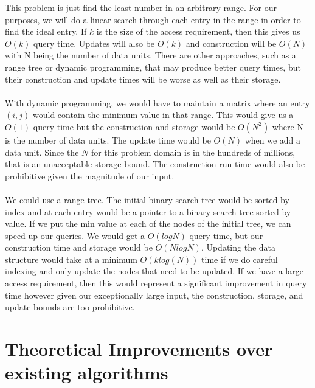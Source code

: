\documentclass[conference]{acmsiggraph}
\begin{document}
This problem is just find the least number in an arbitrary range. For our purposes, we will do a linear search through each entry in the range in order to find the ideal entry. If $k$ is the size of the access requirement, then this gives us $O(k)$ query time. Updates will also be $O(k)$ and construction will be $O(N)$ with N being the number of data units. There are other approaches, such as a range tree or dynamic programming, that may produce better query times, but their construction and update times will be worse as well as their storage. \\
\\
With dynamic programming, we would have to maintain a matrix where an entry $(i,j)$ would contain the minimum value in that range. This would give us a $O(1)$ query time but the construction and storage would be $O(N^2)$ where N is the number of data units. The update time would be $O(N)$ when we add a data unit. Since the $N$ for this problem domain is in the hundreds of millions, that is an unacceptable storage bound. The construction run time would also be prohibitive given the magnitude of our input. \\
\\
We could use a range tree. The initial binary search tree would be sorted by index and at each entry would be a pointer to a binary search tree sorted by value. If we put the min value at each of the nodes of the initial tree, we can speed up our queries. We would get a $O(log N)$ query time, but our construction time and storage would be $O(N log N)$. Updating the data structure would take at a minimum $O(k log(N))$ time if we do careful indexing and only update the nodes that need to be updated. If we have a large access requirement, then this would represent a significant improvement in query time however given our exceptionally large input, the construction, storage, and update bounds are too prohibitive.  


\section{Theoretical Improvements over existing algorithms}
\end{document}
